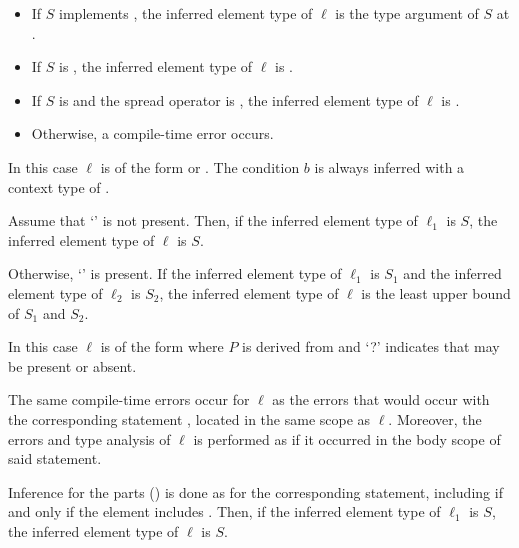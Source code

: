 \documentclass[makeidx]{article}
\begin{document}
{\begin{itemize}
\item
  If $S$ implements ,
  the inferred element type of $\ell$ is
  the type argument of $S$ at .
\item
  If $S$ is \DYNAMIC,
  the inferred element type of $\ell$ is \DYNAMIC.
\item
  If $S$ is  and the spread operator is ,
  the inferred element type of $\ell$ is .
\item
  Otherwise, a compile-time error occurs.
\end{itemize}
\vspace{-5mm}
\EndCase

\LMHash{}%
In this case $\ell$ is of the form
 or
.
The condition $b$ is always inferred with a context type of .

Assume that `' is not present.
Then, if the inferred element type of $\ell_1$ is $S$,
the inferred element type of $\ell$ is $S$.

Otherwise, `' is present.
If the inferred element type of $\ell_1$ is $S_1$ and
the inferred element type of $\ell_2$ is $S_2$,
the inferred element type of $\ell$ is
the least upper bound of $S_1$ and $S_2$.
\EndCase

\LMHash{}%
In this case $\ell$ is of the form
where $P$ is derived from  and
`\AWAIT?' indicates that \AWAIT{} may be present or absent.

The same compile-time errors occur for $\ell$ as
the errors that would occur with the corresponding \FOR{} statement
,
located in the same scope as $\ell$.
Moreover, the errors and type analysis of $\ell$ is performed
as if it occurred in the body scope of said \FOR{} statement.

Inference for the parts
()
is done as for the corresponding \FOR{} statement,
including \AWAIT{} if and only if the element includes \AWAIT.
Then, if the inferred element type of $\ell_1$ is $S$,
the inferred element type of $\ell$ is $S$.

}
\end{document}
